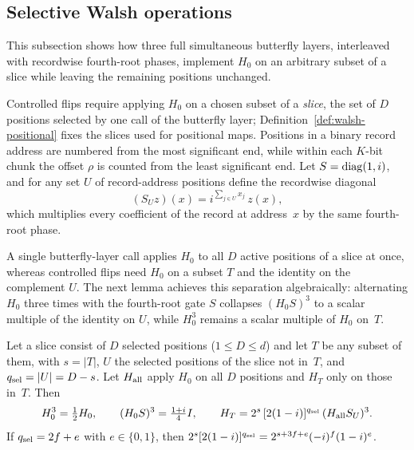\subsection{Selective Walsh operations}\label{sec:walsh-select}

This subsection shows how three full simultaneous butterfly layers, interleaved with recordwise fourth-root phases,
implement $H_0$ on an arbitrary subset of a slice while leaving the remaining positions unchanged.

Controlled flips require applying $H_0$ on a chosen subset of a \emph{slice}, the set of $D$ positions selected by one
call of the butterfly layer; Definition~\ref{def:walsh-positional} fixes the slices used for positional maps. Positions
in a binary record address are numbered from the most significant end, while within each $K$-bit chunk the offset $\rho$
is counted from the least significant end. Let $S=\operatorname{diag}(1,i)$, and for any set $U$ of record-address positions define
the recordwise diagonal
\begin{equation}\label{eq:walsh-SU}
  (S_Uz)(x)=i^{\sum_{j\in U}x_j}\,z(x),
\end{equation}
which multiplies every coefficient of the record at address~$x$ by the same fourth-root phase.

A single butterfly-layer call applies $H_0$ to all $D$ active positions of a slice at once, whereas controlled flips
need $H_0$ on a subset $T$ and the identity on the complement $U$. The next lemma achieves this separation
algebraically: alternating $H_0$ three times with the fourth-root gate $S$ collapses $(H_0 S)^3$ to a scalar multiple of
the identity on $U$, while $H_0^3$ remains a scalar multiple of $H_0$ on~$T$.

\begin{lemma}\label{lem:walsh-select}
Let a slice consist of $D$ selected positions ($1\le D\le d$) and let $T$ be any subset of them, with $s=|T|$, $U$ the
selected positions of the slice not in~$T$, and $q_{\rm sel}=|U|=D-s$. Let $H_{\rm all}$ apply $H_0$ on all $D$
positions and $H_T$ only on those in~$T$. Then
\begin{equation}\label{eq:walsh-three-layer}
  H_0^3=\tfrac12H_0,\qquad (H_0S)^3=\tfrac{1+i}{4}I,\qquad
  H_T=2^s\,[2(1-i)]^{q_{\rm sel}}\,(H_{\rm all}S_U)^3 .
\end{equation}
If $q_{\rm sel}=2f+e$ with $e\in\{0,1\}$, then $2^s[2(1-i)]^{q_{\rm sel}}=2^{s+3f+e}(-i)^f(1-i)^e$.
\end{lemma}

